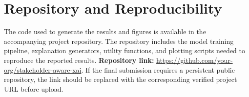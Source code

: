 \documentclass{article}
\begin{document}
\section{Repository and Reproducibility}

The code used to generate the results and figures is available in the accompanying project repository. The repository includes the model training pipeline, explanation generators, utility functions, and plotting scripts needed to reproduce the reported results. \textbf{Repository link:} \url{https://github.com/your-org/stakeholder-aware-xai}. If the final submission requires a persistent public repository, the link should be replaced with the corresponding verified project URL before upload.



\end{document}
